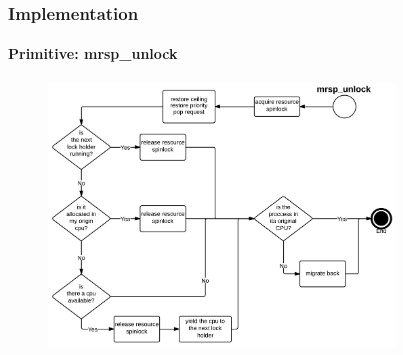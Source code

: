 \begin{frame}

	\frametitle{Implementation}
	\framesubtitle{Primitive: mrsp\_unlock}

	\begin{figure}
		\includegraphics[height=7cm]{../images/slides/slide_mrsp_unlock.png}
	\end{figure}

\end{frame}








